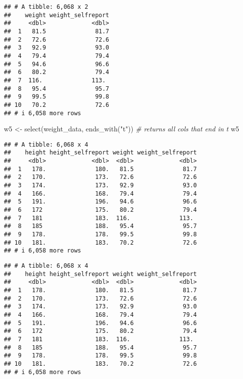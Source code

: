 \documentclass[
]{article}
\newenvironment{Shaded}{\begin{snugshade}}{\end{snugshade}}
\newcommand{\CommentTok}[1]{\textcolor[rgb]{0.56,0.35,0.01}{\textit{#1}}}
\newcommand{\FunctionTok}[1]{\textcolor[rgb]{0.00,0.00,0.00}{#1}}
\newcommand{\NormalTok}[1]{#1}
\newcommand{\OtherTok}[1]{\textcolor[rgb]{0.56,0.35,0.01}{#1}}
\newcommand{\StringTok}[1]{\textcolor[rgb]{0.31,0.60,0.02}{#1}}
\begin{document}
\begin{verbatim}
## # A tibble: 6,068 x 2
##    weight weight_selfreport
##     <dbl>             <dbl>
##  1   81.5              81.7
##  2   72.6              72.6
##  3   92.9              93.0
##  4   79.4              79.4
##  5   94.6              96.6
##  6   80.2              79.4
##  7  116.              113. 
##  8   95.4              95.7
##  9   99.5              99.8
## 10   70.2              72.6
## # i 6,058 more rows
\end{verbatim}

\begin{Shaded}
\begin{Highlighting}[]
\NormalTok{w5 }\OtherTok{\textless{}{-}} \FunctionTok{select}\NormalTok{(weight\_data, }\FunctionTok{ends\_with}\NormalTok{(}\StringTok{"t"}\NormalTok{)) }\CommentTok{\# returns all cols that end in t}
\NormalTok{w5}
\end{Highlighting}
\end{Shaded}

\begin{verbatim}
## # A tibble: 6,068 x 4
##    height height_selfreport weight weight_selfreport
##     <dbl>             <dbl>  <dbl>             <dbl>
##  1   178.              180.   81.5              81.7
##  2   170.              173.   72.6              72.6
##  3   174.              173.   92.9              93.0
##  4   166.              168.   79.4              79.4
##  5   191.              196.   94.6              96.6
##  6   172               175.   80.2              79.4
##  7   181               183.  116.              113. 
##  8   185               188.   95.4              95.7
##  9   178.              178.   99.5              99.8
## 10   181.              183.   70.2              72.6
## # i 6,058 more rows
\end{verbatim}

\begin{Shaded}
\end{Shaded}

\begin{verbatim}
## # A tibble: 6,068 x 4
##    height height_selfreport weight weight_selfreport
##     <dbl>             <dbl>  <dbl>             <dbl>
##  1   178.              180.   81.5              81.7
##  2   170.              173.   72.6              72.6
##  3   174.              173.   92.9              93.0
##  4   166.              168.   79.4              79.4
##  5   191.              196.   94.6              96.6
##  6   172               175.   80.2              79.4
##  7   181               183.  116.              113. 
##  8   185               188.   95.4              95.7
##  9   178.              178.   99.5              99.8
## 10   181.              183.   70.2              72.6
## # i 6,058 more rows
\end{verbatim}
\end{document}
